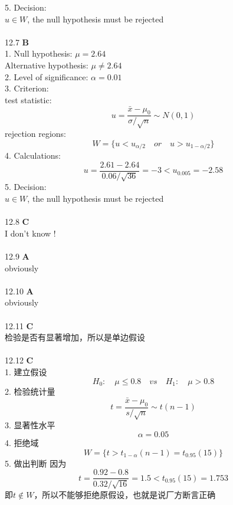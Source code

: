 \documentclass[a4paper]{ctexart}    %
\begin{document}
	5. Decision: \\
	$ u \in W $, the null hypothesis must be rejected \\ \\
	12.7 \quad \textbf{B} \\
	1. Null hypothesis: $ \mu = 2.64 $ \\
	Alternative hypothesis: $ \mu \neq 2.64 $ \\
	2. Level of significance: $ \alpha = 0.01 $ \\
	3. Criterion: \\
	test statistic:
	\begin{equation*}
		u = \frac{\bar{x} - \mu_0}{\sigma / \sqrt{n}} \sim N(0, 1)
	\end{equation*}
	rejection regions:
	\begin{equation*}
		W = \{u < u_{\alpha / 2} \quad or \quad u > u_{1-\alpha / 2}\}
	\end{equation*}
	4. Calculations:
	\begin{equation*}
		u = \frac{2.61 - 2.64}{0.06 / \sqrt{36}} = -3 < u_{0.005} = -2.58
	\end{equation*}
	5. Decision: \\
	$ u \in W $, the null hypothesis must be rejected \\ \\
	12.8 \quad \textbf{C} \\
	I don't know ! \\ \\
	12.9 \quad \textbf{A} \\
	obviously \\ \\
	12.10 \quad \textbf{A} \\
	obviously \\ \\
	12.11 \quad \textbf{C} \\
	检验是否有显著增加，所以是单边假设 \\ \\
	12.12 \quad \textbf{C} \\
	1. 建立假设 
	\begin{equation*}
		H_0: \quad \mu \leq 0.8 \quad vs \quad H_1: \quad \mu > 0.8
	\end{equation*}
	2. 检验统计量
	\begin{equation*}
		t = \frac{\bar{x} - \mu_0}{s / \sqrt{n}} \sim t(n-1)
	\end{equation*}
	3. 显著性水平
	\begin{equation*}
		\alpha = 0.05
	\end{equation*}
	4. 拒绝域
	\begin{equation*}
		W = \{t > t_{1-\alpha}(n-1) = t_{0.95}(15)\} 
	\end{equation*}
	5. 做出判断
	因为
	\begin{equation*}
		t = \frac{0.92 - 0.8}{0.32 / \sqrt{16}} = 1.5 < t_{0.95}(15) = 1.753
	\end{equation*}
	即$ t \notin W $，所以不能够拒绝原假设，也就是说厂方断言正确
	\newpage
\end{document}
